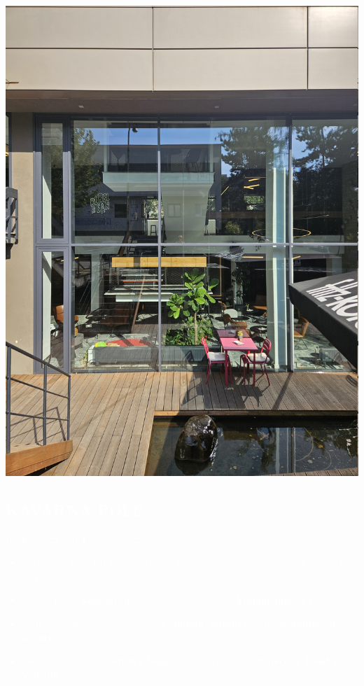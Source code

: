 \documentclass[a5paper, twoside]{article}
\begin{document}
\begin{yellowbox}
	\begin{minipage}{0.27\textwidth}
		\includegraphics[width=\linewidth]{pole.jpg}
	\end{minipage}
	\hfill
	\begin{minipage}{0.7\textwidth}
		\vspace{-5pt}
		\textcolor{white}{
			\subsection*{KAVÁRNA POLE}
			Po--Pá: 8--22 hod $\bullet$ So, Ne: 9--22 hod
			\small
			\begin{itemize}[leftmargin=10pt]
				\item z nám. 28. října jeď jednu zastávku šalinou na Dětskou nemocnici, pak je to za rohem
				\item značka kávy: \textbf{Vescovi} (italská rodinná značka) a \textbf{Mamacoffee} (z Prahy)
				\item mají od všeho něco: solidní výběr \textbf{snídaní}, \textbf{panini} i sladkých \textbf{domácích dezertů}
				\item obsluha doporučuje \textbf{olivový bagel}, naše redakce zase \textbf{zapečený toust s vejcemi}
			\end{itemize}
		}
	\end{minipage}
\end{yellowbox}
\end{document}
